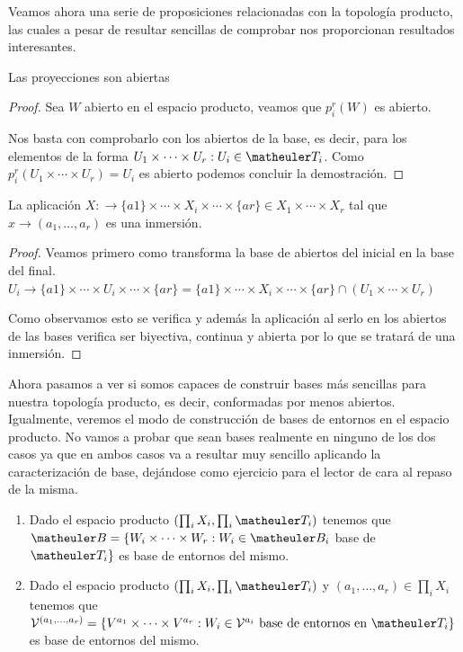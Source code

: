 Veamos ahora una serie de proposiciones relacionadas con la topología producto, las cuales a pesar de resultar sencillas de comprobar nos proporcionan resultados interesantes.

\begin{prop}
	Las proyecciones son abiertas
	
	\begin{proof}
		Sea $W$ abierto en el espacio producto, veamos que $p_i^r(W)$ es abierto.
		
		Nos basta con comprobarlo con los abiertos de la base, es decir, para los elementos de la forma $ U_1\times\cdots\times U_r : U_i\in \T_i$.  Como  $p_i^r(U_1\times\cdots\times U_r)=U_i$ es abierto podemos concluir la demostración.
	\end{proof}
\end{prop}


\begin{prop}
	La aplicación $X:\longrightarrow\{a1\}\times\cdots\times X_i\times\cdots\times \{ar\}\in X_1\times\cdots\times X_r$ tal que $x\longrightarrow (a_1,\dots,a_r)$ es una inmersión.
	
	\begin{proof}
		Veamos primero como transforma la base de abiertos del inicial en la base del final.
		$U_i\longrightarrow\{a1\}\times\cdots\times U_i\times\cdots\times \{ar\}=\{a1\}\times\cdots\times X_i\times\cdots\times \{ar\}\cap(U_1\times\cdots\times U_r)$
		
		Como observamos esto se verifica y además la aplicación al serlo en los abiertos de las bases verifica ser biyectiva, continua y abierta por lo que se tratará de una inmersión.
	\end{proof}
\end{prop}

Ahora pasamos a ver si somos capaces de construir bases más sencillas para nuestra topología producto, es decir, conformadas por menos abiertos. Igualmente, veremos el modo de construcción de bases de entornos en el espacio producto. No vamos a probar que sean bases realmente en ninguno de los dos casos ya que en ambos casos va a resultar muy sencillo aplicando la caracterización de base, dejándose como ejercicio para el lector de cara al repaso de la misma.
\begin{enumerate}
	\item Dado el espacio producto $(\prod_iX_i,\prod_i\T_i)$ tenemos que $\B=\{W_i\times\cdots\times W_r:W_i\in \B_i$ base de $\T_i\}$ es base de entornos del mismo.
	\item Dado el espacio producto $(\prod_iX_i,\prod_i\T_i)$ y $(a_1,\dots,a_r)\in\prod_iX_i$ tenemos que $\V^{(a_1,\dots,a_r)}=\{V^{a_1}\times\cdots\times V^{a_r}:W_i\in \V^{a_i} \text{ base de entornos en } \T_i \}$ es base de entornos del mismo.
\end{enumerate}

